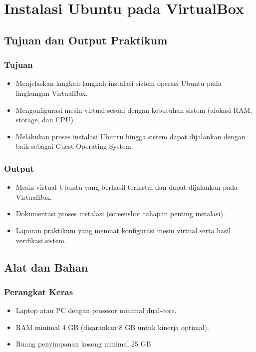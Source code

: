 
\chapter{Instalasi Ubuntu pada VirtualBox}
\label{chap:handson-01}

\section*{Tujuan dan Output Praktikum}
\subsection*{Tujuan}
    \begin{itemize}
        \item Menjelaskan langkah-langkah instalasi sistem operasi Ubuntu pada lingkungan VirtualBox.
        \item Mengonfigurasi mesin virtual sesuai dengan kebutuhan sistem (alokasi RAM, storage, dan CPU).
        \item Melakukan proses instalasi Ubuntu hingga sistem dapat dijalankan dengan baik sebagai Guest Operating System.
    \end{itemize}

\subsection*{Output}
    \begin{itemize}
        \item Mesin virtual Ubuntu yang berhasil terinstal dan dapat dijalankan pada VirtualBox.
        \item Dokumentasi proses instalasi (screenshot tahapan penting instalasi).
        \item Laporan praktikum yang memuat konfigurasi mesin virtual serta hasil verifikasi sistem.
    \end{itemize}

\section*{Alat dan Bahan}
\subsection*{Perangkat Keras}
    \begin{itemize}
        \item Laptop atau PC dengan prosesor minimal dual-core.
        \item RAM minimal 4 GB (disarankan 8 GB untuk kinerja optimal).
        \item Ruang penyimpanan kosong minimal 25 GB.
    \end{itemize}

